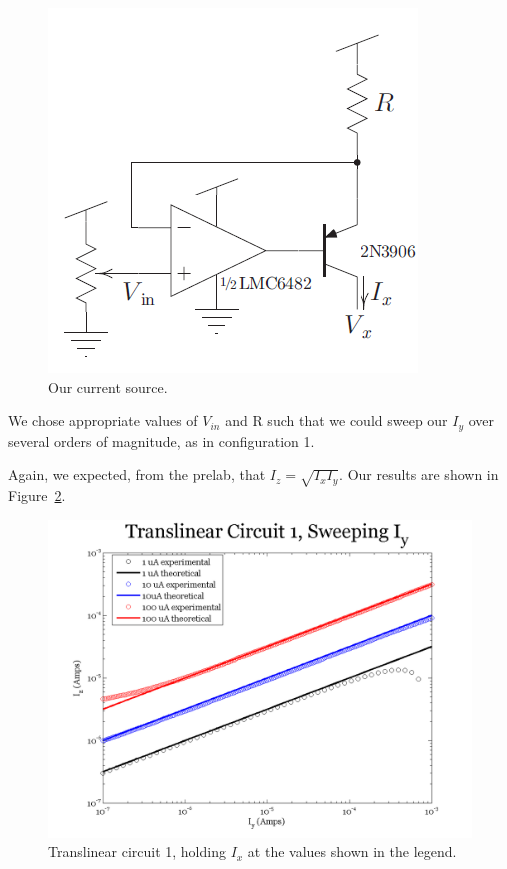 \documentclass{article}
\begin{document}
\begin{figure}[H]
\begin{center}
\includegraphics[scale=.5]{source.png}
\caption{Our current source.}
\label{fig:source}
\end{center}
\end{figure}

We chose appropriate values of $V_{in}$ and R such that we could sweep our $I_y$ over several orders of magnitude, as in configuration 1.

Again, we expected, from the prelab, that $I_z = \sqrt{I_xI_y}$.  Our results are shown in Figure~\ref{fig:exp2sweepy}.

\begin{figure}[H]
\begin{center}
\includegraphics[scale=.75]{exp2_sweepy.png}
\caption{Translinear circuit 1, holding $I_x$ at the values shown in the legend.}
\label{fig:exp2sweepy}
\end{center}
\end{figure}
\end{document}
